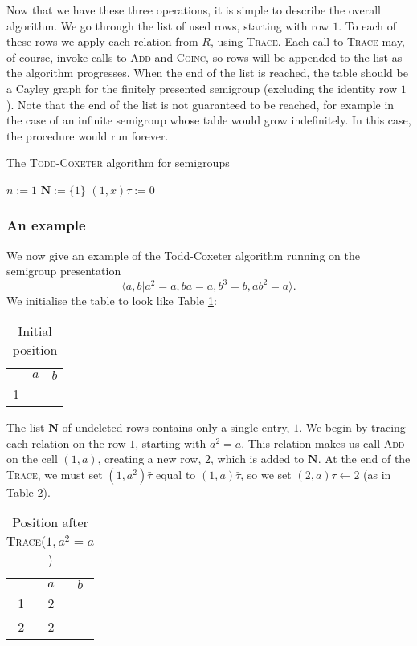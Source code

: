 Now that we have these three operations, it is simple to describe the overall
algorithm.  We go through the list of used rows, starting with row $1$.  To each
of these rows we apply each relation from $R$, using \textsc{Trace}.  Each call
to \textsc{Trace} may, of course, invoke calls to \textsc{Add} and
\textsc{Coinc}, so rows will be appended to the list as the algorithm
progresses.  When the end of the list is reached, the table should be a Cayley
graph for the finitely presented semigroup (excluding the identity row $1$).
Note that the end of the list is not guaranteed to be reached, for example in
the case of an infinite semigroup whose table would grow indefinitely.  In this
case, the procedure would run forever.

\begin{algorithm}
\caption{The \textsc{Todd-Coxeter} algorithm for semigroups}
\label{alg:tc}
\begin{algorithmic}[1]
\State $n := 1$
\State $\mathbf{N} := \{1\}$
  \State $(1, x)\tau := 0$
\EndFor
{}
    \State {}
  \EndFor
\EndFor
\EndProcedure
\end{algorithmic}
\end{algorithm}

\subsubsection{An example}
We now give an example of the Todd-Coxeter algorithm running on the semigroup
presentation
$$\langle a, b | a^2=a, ba=a, b^3=b, ab^2=a \rangle.$$
We initialise the table to look like Table \ref{tab:tc1}:
\begin{table}[H]
  \centering
  \begin{tabular}{c | c | c |}
    \multicolumn{1}{c}{} &
    \multicolumn{1}{c}{$a$} &
    \multicolumn{1}{c}{$b$} \\
    \cline{2-3}
    1 & & \\
    \cline{2-3}
  \end{tabular}
  \caption{Initial position}
  \label{tab:tc1}
\end{table}
The list $\mathbf{N}$ of undeleted rows contains only a single entry, $1$.  We
begin by tracing each relation on the row $1$, starting with $a^2=a$.  This
relation makes us call \textsc{Add} on the cell $(1, a)$, creating a new
row, $2$, which is added to $\mathbf{N}$.  At the end of the \textsc{Trace}, we
must set $(1, a^2)\bar\tau$ equal to $(1, a)\bar\tau$,
so we set $(2, a)\tau \gets 2$ (as in Table \ref{tab:tc2}).
\begin{table}[H]
  \centering
  \begin{tabular}{c | c | c |}
    \multicolumn{1}{c}{} &
    \multicolumn{1}{c}{$a$} &
    \multicolumn{1}{c}{$b$} \\
    \cline{2-3}
    1 & 2 & \\
    \cline{2-3}
    2 & 2 & \\
    \cline{2-3}
  \end{tabular}
  \caption{Position after \textsc{Trace}($1, a^2=a$)}
  \label{tab:tc2}
\end{table}

